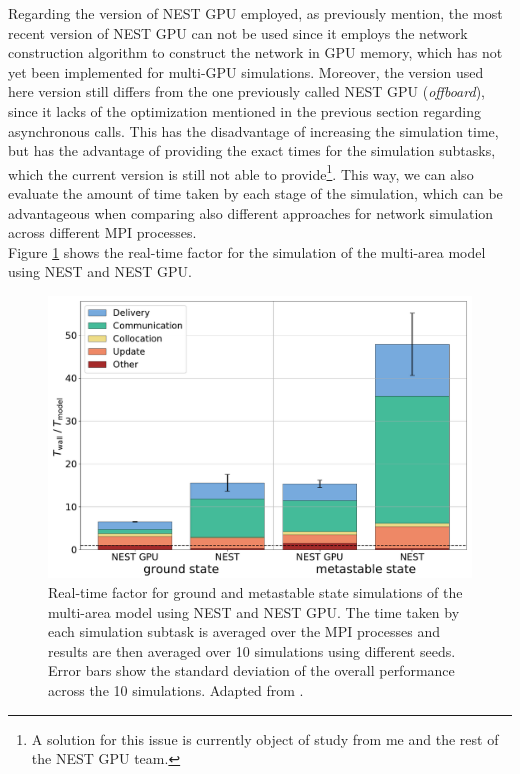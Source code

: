 \documentclass[a4paper, 12pt, twoside, openright]{book}
\begin{document}
Regarding the version of NEST GPU employed, as previously mention, the most recent version of NEST GPU can not be used since it employs the network construction algorithm to construct the network in GPU memory, which has not yet been implemented for multi-GPU simulations. Moreover, the version used here version still differs from the one previously called NEST GPU (\textit{offboard}), since it lacks of the optimization mentioned in the previous section regarding asynchronous calls. This has the disadvantage of increasing the simulation time, but has the advantage of providing the exact times for the simulation subtasks, which the current version is still not able to provide\footnote{A solution for this issue is currently object of study from me and the rest of the NEST GPU team.}. This way, we can also evaluate the amount of time taken by each stage of the simulation, which can be advantageous when comparing also different approaches for network simulation across different MPI processes.\\
Figure \ref{fig:mam_benchmark} shows the real-time factor for the simulation of the multi-area model using NEST and NEST GPU.

\begin{figure}[H]
    \centering
    \includegraphics[width=\columnwidth]{figures/mam_rtf.pdf}
    \caption{Real-time factor for ground and metastable state simulations of the multi-area model using NEST and NEST GPU. The time taken by each simulation subtask is averaged over the MPI processes and results are then averaged over 10 simulations using different seeds. Error bars show the standard deviation of the overall performance across the 10 simulations. Adapted from \cite{Tiddia2022}.}
    \label{fig:mam_benchmark}
\end{figure}
\end{document}
